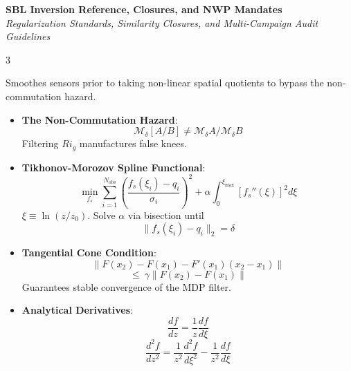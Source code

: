 \documentclass[9pt,landscape,letterpaper]{article}
\begin{document}
\newpage


\begin{center}
    \textbf{\large SBL Inversion Reference, Closures, and NWP Mandates} \\
    \vskip 0.5mm
    \footnotesize \textit{Regularization Standards, Similarity Closures, and Multi-Campaign Audit Guidelines}
\end{center}
\vskip 1mm

\begin{multicols}{3}
\footnotesize

\begin{tcolorbox}[cheatsheetbox, title=4. Track A Primitive Regularization]
Smoothes sensors prior to taking non-linear spatial quotients to bypass the non-commutation hazard.
\begin{itemize}
    \item \textbf{The Non-Commutation Hazard}:
    $$\mathcal{M}_\delta \left[ A / B \right] \neq \mathcal{M}_\delta A / \mathcal{M}_\delta B$$
    Filtering $Ri_g$ manufactures false knees.
    \item \textbf{Tikhonov-Morozov Spline Functional}:
    $$\min_{f_s} \sum_{i=1}^{N_{\text{obs}}} \left( \frac{f_s(\xi_i) - q_i}{\sigma_i} \right)^2 + \alpha \int_0^{\xi_{\max}} [f_s''(\xi)]^2 d\xi$$
    $\xi \equiv \ln(z/z_0)$. Solve $\alpha$ via bisection until
    $$\|f_s(\xi_i) - q_i\|_2 = \delta$$
    \item \textbf{Tangential Cone Condition}:
    $$\|F(x_2) - F(x_1) - F'(x_1)(x_2 - x_1)\|$$
    $$\le \ \gamma \|F(x_2) - F(x_1)\|$$
    Guarantees stable convergence of the MDP filter.
    \item \textbf{Analytical Derivatives}:
    $$\frac{df}{dz} = \frac{1}{z} \frac{df}{d\xi}$$
    $$\frac{d^2f}{dz^2} = \frac{1}{z^2}\frac{d^2f}{d\xi^2} - \frac{1}{z^2}\frac{df}{d\xi}$$
\end{itemize}
\end{tcolorbox}

\columnbreak


\end{multicols}
\end{document}

